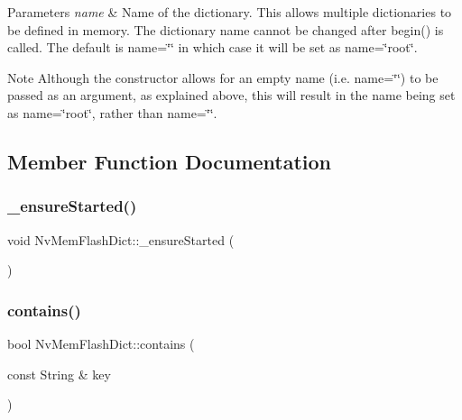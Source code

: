 \begin{DoxyParams}{Parameters}
{\em name} & Name of the dictionary. This allows multiple dictionaries to be defined in memory. The dictionary name cannot be changed after begin() is called. The default is {\ttfamily name=\char`\"{}\char`\"{}} in which case it will be set as {\ttfamily name=\char`\"{}root\char`\"{}}.\\
\hline
\end{DoxyParams}
\begin{DoxyNote}{Note}
Although the constructor allows for an empty name (i.\+e. {\ttfamily name=\char`\"{}\char`\"{}}) to be passed as an argument, as explained above, this will result in the name being set as {\ttfamily name=\char`\"{}root\char`\"{}}, rather than {\ttfamily name=\char`\"{}\char`\"{}}. 
\end{DoxyNote}


\subsection{Member Function Documentation}
\mbox{\label{class_nv_mem_flash_dict_a00390a7c91035e6a7f21df343f6440bc}} 
\subsubsection{\texorpdfstring{\_ensureStarted()}{\_ensureStarted()}}
{\footnotesize\ttfamily void Nv\+Mem\+Flash\+Dict\+::\+\_\+ensure\+Started (\begin{DoxyParamCaption}{ }\end{DoxyParamCaption})\hspace{0.3cm}{\ttfamily [private]}}

\mbox{\label{class_nv_mem_flash_dict_aab2e9f6da1d6ba89df32c20b1746ea75}} 
\subsubsection{\texorpdfstring{contains()}{contains()}}
{\footnotesize\ttfamily bool Nv\+Mem\+Flash\+Dict\+::contains (\begin{DoxyParamCaption}\item[{const String \&}]{key }\end{DoxyParamCaption})\hspace{0.3cm}{\ttfamily [virtual]}}



